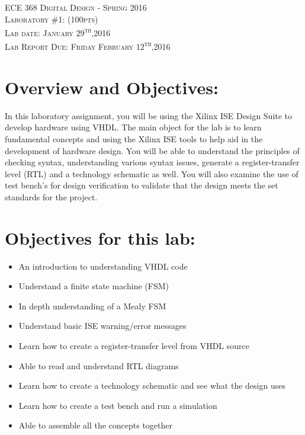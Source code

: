 \documentclass{article}
\begin{document}
\begin{center}
\textsc{\huge ECE 368 Digital Design - Spring 2016}\\[1cm]
\textsc{{\LARGE Laboratory \#1: (100pts)}}\\[0.5cm]
\textsc{\Large Lab date: January $29$\textsuperscript{th},2016}\\[0.5cm]
\textsc{\Large Lab Report Due: Friday February $12$\textsuperscript{th},2016}\\[1cm]
\end{center}

\section{Overview and Objectives:}
In this laboratory assignment, you will be using the Xilinx ISE Design Suite to develop hardware using VHDL. The main object for the lab is to learn fundamental concepts and using the Xilinx ISE tools to help aid in the development of hardware design. You will be able to understand the principles of checking syntax, understanding various syntax issues, generate a register-transfer level (RTL) and a technology schematic as well. You will also examine the use of test bench's for design verification to validate that the design meets the set standards for the project.

\section{Objectives for this lab:}
\begin{itemize}
  \item An introduction to understanding VHDL code
  \item Understand a finite state machine (FSM)
  \item In depth understanding of a Mealy FSM
  \item Understand basic ISE warning/error messages
  \item Learn how to create a register-transfer level from VHDL source
  \item Able to read and understand RTL diagrams
  \item Learn how to create a technology schematic and see what the design uses
  \item Learn how to create a test bench and run a simulation
  \item Able to assemble all the concepts together
\end{itemize}
\end{document}
